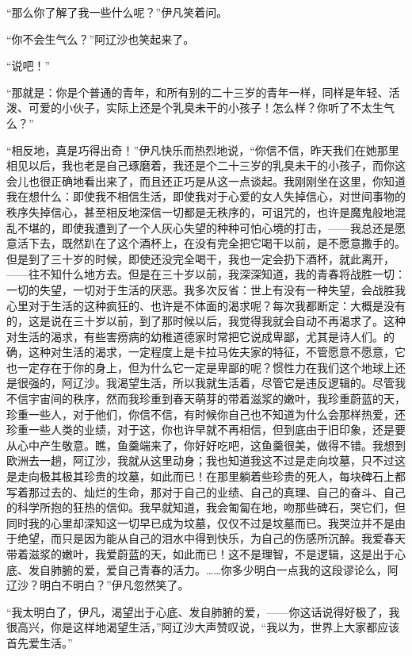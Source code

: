\par “那么你了解了我一些什么呢？”伊凡笑着问。
\par “你不会生气么？”阿辽沙也笑起来了。
\par “说吧！”
\par “那就是：你是个普通的青年，和所有别的二十三岁的青年一样，同样是年轻、活泼、可爱的小伙子，实际上还是个乳臭未干的小孩子！怎么样？你听了不太生气么？”
\par “相反地，真是巧得出奇！”伊凡快乐而热烈地说，“你信不信，昨天我们在她那里相见以后，我也老是自己琢磨着，我还是个二十三岁的乳臭未干的小孩子，而你这会儿也很正确地看出来了，而且还正巧是从这一点谈起。我刚刚坐在这里，你知道我在想什么：即使我不相信生活，即使我对于心爱的女人失掉信心，对世间事物的秩序失掉信心，甚至相反地深信一切都是无秩序的，可诅咒的，也许是魔鬼般地混乱不堪的，即使我遭到了一个人灰心失望的种种可怕心境的打击，——我总还是愿意活下去，既然趴在了这个酒杯上，在没有完全把它喝干以前，是不愿意撒手的。但是到了三十岁的时候，即使还没完全喝干，我也一定会扔下酒杯，就此离开，——往不知什么地方去。但是在三十岁以前，我深深知道，我的青春将战胜一切：一切的失望，一切对于生活的厌恶。我多次反省：世上有没有一种失望，会战胜我心里对于生活的这种疯狂的、也许是不体面的渴求呢？每次我都断定：大概是没有的，这是说在三十岁以前，到了那时候以后，我觉得我就会自动不再渴求了。这种对生活的渴求，有些害痨病的幼稚道德家时常把它说成卑鄙，尤其是诗人们。的确，这种对生活的渴求，一定程度上是卡拉马佐夫家的特征，不管愿意不愿意，它也一定存在于你的身上，但为什么它一定是卑鄙的呢？惯性力在我们这个地球上还是很强的，阿辽沙。我渴望生活，所以我就生活着，尽管它是违反逻辑的。尽管我不信宇宙间的秩序，然而我珍重到春天萌芽的带着滋浆的嫩叶，我珍重蔚蓝的天，珍重一些人，对于他们，你信不信，有时候你自己也不知道为什么会那样热爱，还珍重一些人类的业绩，对于这，你也许早就不再相信，但到底由于旧印象，还是要从心中产生敬意。瞧，鱼羹端来了，你好好吃吧，这鱼羹很美，做得不错。我想到欧洲去一趟，阿辽沙，我就从这里动身；我也知道我这不过是走向坟墓，只不过这是走向极其极其珍贵的坟墓，如此而已！在那里躺着些珍贵的死人，每块碑石上都写着那过去的、灿烂的生命，那对于自己的业绩、自己的真理、自己的奋斗、自己的科学所抱的狂热的信仰。我早就知道，我会匍匐在地，吻那些碑石，哭它们，但同时我的心里却深知这一切早已成为坟墓，仅仅不过是坟墓而已。我哭泣并不是由于绝望，而只是因为能从自己的泪水中得到快乐，为自己的伤感所沉醉。我爱春天带着滋浆的嫩叶，我爱蔚蓝的天，如此而已！这不是理智，不是逻辑，这是出于心底、发自肺腑的爱，爱自己青春的活力。……你多少明白一点我的这段谬论么，阿辽沙？明白不明白？”伊凡忽然笑了。
\par “我太明白了，伊凡，渴望出于心底、发自肺腑的爱，——你这话说得好极了，我很高兴，你是这样地渴望生活，”阿辽沙大声赞叹说，“我以为，世界上大家都应该首先爱生活。”
